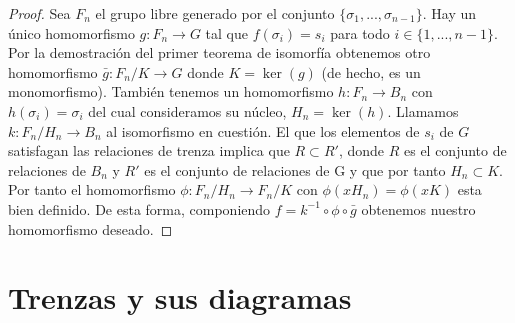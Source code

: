 \documentclass[12pt]{book}
\theoremstyle{definition}
\begin{document}
\begin{proof} Sea $F_n$ el grupo libre generado por el conjunto $\{\sigma_1,...,\sigma_{n-1}\}$. Hay un único homomorfismo $g:F_n\rightarrow G$ tal que $f(\sigma_i)= s_i$ para todo $i\in\{1,...,n-1\}$. Por la demostración del primer teorema de isomorfía obtenemos otro homomorfismo $\bar{g}:F_n/K\rightarrow G$ donde $K=\ker(g)$ (de hecho, es un monomorfismo). También tenemos un homomorfismo $h:F_n\rightarrow B_n$ con $h(\sigma_i)=\sigma_i$ del cual consideramos su núcleo, $H_n=\ker(h)$. Llamamos $k:F_n/H_n\rightarrow B_n$ al isomorfismo en cuestión. El que los elementos de $s_i$ de $G$ satisfagan las relaciones de trenza implica que $R\subset R'$, donde $R$ es el conjunto de relaciones de $B_n$ y $R'$ es el conjunto de relaciones de G y que por tanto $H_n\subset K$. Por tanto el homomorfismo $\phi:F_n/H_n\rightarrow F_n/K$ con $\phi(xH_n)=\phi(xK)$ esta bien definido. De esta forma, componiendo $f=k^{-1}\circ \phi \circ \bar{g}$ obtenemos nuestro homomorfismo deseado.
\end{proof}



\section{Trenzas y sus diagramas}
\end{document}
